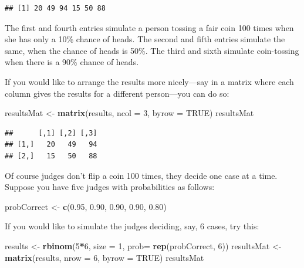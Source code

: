 \documentclass[]{book}
\makeatletter
\newenvironment{Shaded}{\begin{snugshade}}{\end{snugshade}}
\newcommand{\KeywordTok}[1]{\textcolor[rgb]{0.13,0.29,0.53}{\textbf{#1}}}
\newcommand{\DataTypeTok}[1]{\textcolor[rgb]{0.13,0.29,0.53}{#1}}
\newcommand{\DecValTok}[1]{\textcolor[rgb]{0.00,0.00,0.81}{#1}}
\newcommand{\FloatTok}[1]{\textcolor[rgb]{0.00,0.00,0.81}{#1}}
\newcommand{\StringTok}[1]{\textcolor[rgb]{0.31,0.60,0.02}{#1}}
\newcommand{\OtherTok}[1]{\textcolor[rgb]{0.56,0.35,0.01}{#1}}
\newcommand{\OperatorTok}[1]{\textcolor[rgb]{0.81,0.36,0.00}{\textbf{#1}}}
\newcommand{\NormalTok}[1]{#1}
\newenvironment{kframe}{%
\medskip{}
\setlength{\fboxsep}{.8em}
 \def\at@end@of@kframe{}%
 \ifinner\ifhmode%
  \def\at@end@of@kframe{\end{minipage}}%
  \begin{minipage}{\columnwidth}%
 \fi\fi%
 \def\FrameCommand##1{\hskip\@totalleftmargin \hskip-\fboxsep
 \colorbox{shadecolor}{##1}\hskip-\fboxsep
     \hskip-\linewidth \hskip-\@totalleftmargin \hskip\columnwidth}%
 \MakeFramed {\advance\hsize-\width
   \@totalleftmargin\z@ \linewidth\hsize
   \@setminipage}}%
 {\par\unskip\endMakeFramed%
 \at@end@of@kframe}
\renewenvironment{Shaded}{\begin{kframe}}{\end{kframe}}
\theoremstyle{definition}
\theoremstyle{definition}
\theoremstyle{definition}
\theoremstyle{remark}
\makeatother
\begin{document}
{\begin{enumerate}
\begin{verbatim}
## [1] 20 49 94 15 50 88
\end{verbatim}

  The first and fourth entries simulate a person tossing a fair coin 100
  times when she has only a 10\% chance of heads. The second and fifth
  entries simulate the same, when the chance of heads is 50\%. The third
  and sixth simulate coin-tossing when there is a 90\% chance of heads.

  If you would like to arrange the results more nicely---say in a matrix
  where each column gives the results for a different person---you can
  do so:

\begin{Shaded}
\begin{Highlighting}[]
\NormalTok{resultsMat <-}\StringTok{ }\KeywordTok{matrix}\NormalTok{(results, }\DataTypeTok{ncol =} \DecValTok{3}\NormalTok{, }\DataTypeTok{byrow =} \OtherTok{TRUE}\NormalTok{)}
\NormalTok{resultsMat}
\end{Highlighting}
\end{Shaded}

\begin{verbatim}
##      [,1] [,2] [,3]
## [1,]   20   49   94
## [2,]   15   50   88
\end{verbatim}

  Of course judges don't flip a coin 100 times, they decide one case at
  a time. Suppose you have five judges with probabilities as follows:

\begin{Shaded}
\begin{Highlighting}[]
\NormalTok{probCorrect <-}\StringTok{ }\KeywordTok{c}\NormalTok{(}\FloatTok{0.95}\NormalTok{, }\FloatTok{0.90}\NormalTok{, }\FloatTok{0.90}\NormalTok{, }\FloatTok{0.90}\NormalTok{, }\FloatTok{0.80}\NormalTok{)}
\end{Highlighting}
\end{Shaded}

  If you would like to simulate the judges deciding, say, 6 cases, try
  this:

\begin{Shaded}
\begin{Highlighting}[]
\NormalTok{results <-}\StringTok{ }\KeywordTok{rbinom}\NormalTok{(}\DecValTok{5}\OperatorTok{*}\DecValTok{6}\NormalTok{, }\DataTypeTok{size =} \DecValTok{1}\NormalTok{, }\DataTypeTok{prob=} \KeywordTok{rep}\NormalTok{(probCorrect, }\DecValTok{6}\NormalTok{))}
\NormalTok{resultsMat <-}\StringTok{ }\KeywordTok{matrix}\NormalTok{(results, }\DataTypeTok{nrow =} \DecValTok{6}\NormalTok{, }\DataTypeTok{byrow =} \OtherTok{TRUE}\NormalTok{)}
\NormalTok{resultsMat}
\end{Highlighting}
\end{Shaded}


\end{enumerate}}
\end{document}
